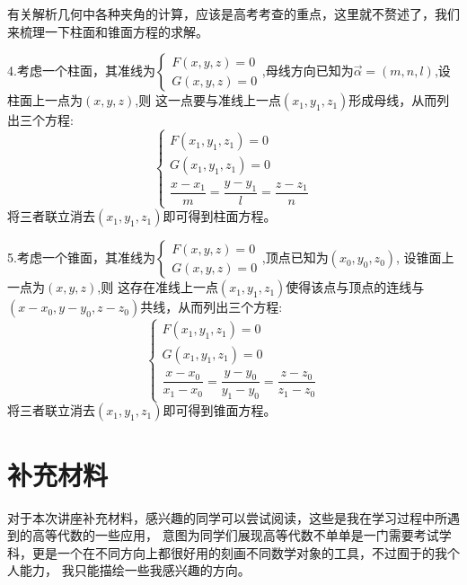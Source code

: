 \documentclass[a4paper,12pt]{ctexart}
\begin{document}
有关解析几何中各种夹角的计算，应该是高考考查的重点，这里就不赘述了，我们来梳理一下柱面和锥面方程的求解。

4.考虑一个柱面，其准线为$\begin{cases}F(x,y,z)=0\\ G(x,y,z)=0\end{cases}$,母线方向已知为$\vec{\alpha}=(m,n,l)$,设柱面上一点为$(x,y,z)$,则
这一点要与准线上一点$(x_1,y_1,z_1)$形成母线，从而列出三个方程:
\begin{equation*}
    \begin{cases}F(x_1,y_1,z_1)=0\\ G(x_1,y_1,z_1)=0\\ \dfrac{x-x_1}{m}=\dfrac{y-y_1}{l}=\dfrac{z-z_1}{n} \end{cases}
\end{equation*}
将三者联立消去$(x_1,y_1,z_1)$即可得到柱面方程。

5.考虑一个锥面，其准线为$\begin{cases}F(x,y,z)=0\\ G(x,y,z)=0\end{cases}$,顶点已知为$(x_0,y_0,z_0)$,
设锥面上一点为$(x,y,z)$,则
这存在准线上一点$(x_1,y_1,z_1)$使得该点与顶点的连线与$(x-x_0,y-y_0,z-z_0)$共线，从而列出三个方程:
\begin{equation*}
    \begin{cases}F(x_1,y_1,z_1)=0\\ G(x_1,y_1,z_1)=0\\ \dfrac{x-x_0}{x_1-x_0}=\dfrac{y-y_0}{y_1-y_0}=\dfrac{z-z_0}{z_1-z_0} \end{cases}
\end{equation*}
将三者联立消去$(x_1,y_1,z_1)$即可得到锥面方程。
\newpage
\section{补充材料}
对于本次讲座补充材料，感兴趣的同学可以尝试阅读，这些是我在学习过程中所遇到的高等代数的一些应用，
意图为同学们展现高等代数不单单是一门需要考试学科，更是一个在不同方向上都很好用的刻画不同数学对象的工具，不过囿于的我个人能力，
我只能描绘一些我感兴趣的方向。
\end{document}
